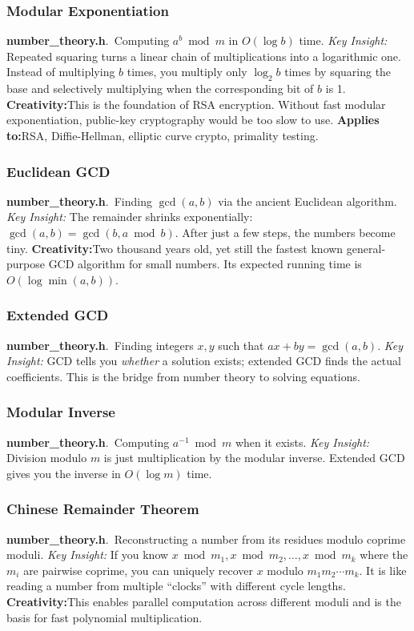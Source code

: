 \documentclass[11pt,a4paper]{article}
\newcommand{\algo}[2]{\textbf{#1}.\ #2}
\newcommand{\insight}{\textit{Key Insight: }}
\newcommand{\creative}{\textcolor{orange!80!black}{\textbf{Creativity:}}}
\newcommand{\applies}{\textcolor{green!50!black}{\textbf{Applies to:}}}
\begin{document}
\subsubsection{Modular Exponentiation}
\algo{number\_theory.h}{Computing \(a^b \bmod m\) in \(O(\log b)\) time.}
\insight Repeated squaring turns a linear chain of multiplications into a logarithmic one. Instead of multiplying \(b\) times, you multiply only \(\log_2 b\) times by squaring the base and selectively multiplying when the corresponding bit of \(b\) is 1.
\creative This is the foundation of RSA encryption. Without fast modular exponentiation, public-key cryptography would be too slow to use.
\applies RSA, Diffie-Hellman, elliptic curve crypto, primality testing.

\subsubsection{Euclidean GCD}
\algo{number\_theory.h}{Finding \(\gcd(a,b)\) via the ancient Euclidean algorithm.}
\insight The remainder shrinks exponentially: \(\gcd(a,b) = \gcd(b, a \bmod b)\). After just a few steps, the numbers become tiny.
\creative Two thousand years old, yet still the fastest known general-purpose GCD algorithm for small numbers. Its expected running time is \(O(\log \min(a,b))\).

\subsubsection{Extended GCD}
\algo{number\_theory.h}{Finding integers \(x,y\) such that \(ax + by = \gcd(a,b)\).}
\insight GCD tells you \textit{whether} a solution exists; extended GCD finds the actual coefficients. This is the bridge from number theory to solving equations.

\subsubsection{Modular Inverse}
\algo{number\_theory.h}{Computing \(a^{-1} \bmod m\) when it exists.}
\insight Division modulo \(m\) is just multiplication by the modular inverse. Extended GCD gives you the inverse in \(O(\log m)\) time.

\subsubsection{Chinese Remainder Theorem}
\algo{number\_theory.h}{Reconstructing a number from its residues modulo coprime moduli.}
\insight If you know \(x \bmod m_1, x \bmod m_2, \ldots, x \bmod m_k\) where the \(m_i\) are pairwise coprime, you can uniquely recover \(x\) modulo \(m_1 m_2 \cdots m_k\). It is like reading a number from multiple ``clocks'' with different cycle lengths.
\creative This enables parallel computation across different moduli and is the basis for fast polynomial multiplication.
\end{document}
